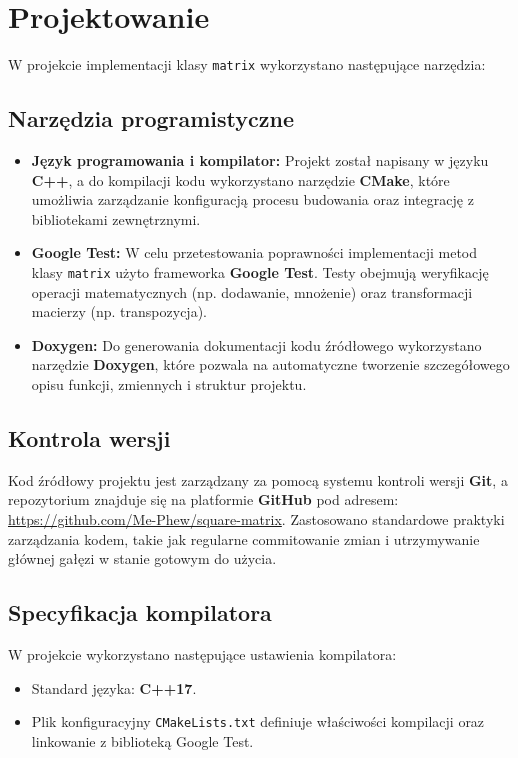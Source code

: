 \newpage
\section{Projektowanie}		%
W projekcie implementacji klasy \texttt{matrix} wykorzystano następujące narzędzia:

\subsection{Narzędzia programistyczne}
\begin{itemize}
  \item \textbf{Język programowania i kompilator:}
        Projekt został napisany w języku \textbf{C++}, a do kompilacji kodu wykorzystano narzędzie \textbf{CMake}, które umożliwia zarządzanie konfiguracją procesu budowania oraz integrację z bibliotekami zewnętrznymi.
  \item \textbf{Google Test:}
        W celu przetestowania poprawności implementacji metod klasy \texttt{matrix} użyto frameworka \textbf{Google Test}. Testy obejmują weryfikację operacji matematycznych (np. dodawanie, mnożenie) oraz transformacji macierzy (np. transpozycja).
  \item \textbf{Doxygen:}
        Do generowania dokumentacji kodu źródłowego wykorzystano narzędzie \textbf{Doxygen}, które pozwala na automatyczne tworzenie szczegółowego opisu funkcji, zmiennych i struktur projektu.
\end{itemize}

\subsection{Kontrola wersji}
Kod źródłowy projektu jest zarządzany za pomocą systemu kontroli wersji \textbf{Git}, a repozytorium znajduje się na platformie \textbf{GitHub} pod adresem:
\url{https://github.com/Me-Phew/square-matrix}.
Zastosowano standardowe praktyki zarządzania kodem, takie jak regularne commitowanie zmian i utrzymywanie głównej gałęzi w stanie gotowym do użycia.

\subsection{Specyfikacja kompilatora}
W projekcie wykorzystano następujące ustawienia kompilatora:
\begin{itemize}
  \item Standard języka: \textbf{C++17}.
  \item Plik konfiguracyjny \texttt{CMakeLists.txt} definiuje właściwości kompilacji oraz linkowanie z biblioteką Google Test.
\end{itemize}

